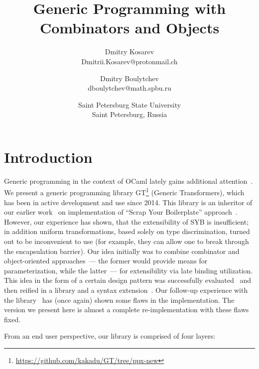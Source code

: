 \documentclass[twocolumn,8pt]{extarticle}
\begin{document}
\title{Generic Programming with
  Combinators and Objects}

\author{Dmitry Kosarev\\
  Dmitrii.Kosarev@protonmail.ch \and
  Dmitry Boulytchev \\
  dboulytchev@math.spbu.ru}

\date{Saint Petersburg State University\\ Saint Petersburg, Russia}

\maketitle

\section{Introduction}

Generic programming in the context of OCaml lately gains additional attention~\cite{Staged,Visitors,GenericOCaml}. 
We present a generic programming library GT\footnote{\url{https://github.com/kakadu/GT/tree/ppx-new}} (Generic Transformers), which has been in active development and use since
2014. This library is an inheritor of our earlier work~\cite{SYBOCaml} on implementation of ``Scrap Your Boilerplate''
approach~\cite{SYB,SYB1,SYB2}. However, our experience has shown, that the extensibility of SYB is insufficient; in addition
uniform transformations, based solely on type discrimination, turned out to be inconvenient to use (for example, they can allow
one to break through the encapsulation barrier). Our idea initially was to combine combinator and object-oriented approaches~--- the former
would provide means for parameterization, while the latter~--- for extensibility via late binding utilization. This idea in the form of
a certain design pattern was successfully evaluated~\cite{SCICO} and then reified in a library and a syntax extension~\cite{TransformationObjects}.
Our follow-up experience with the library~\cite{OCanren} has (once again) shown some flaws in the implementation. The version we present here is
almost a complete re-implementation with these flaws fixed.

From an end user perspective, our library is comprised of four layers:
\end{document}

